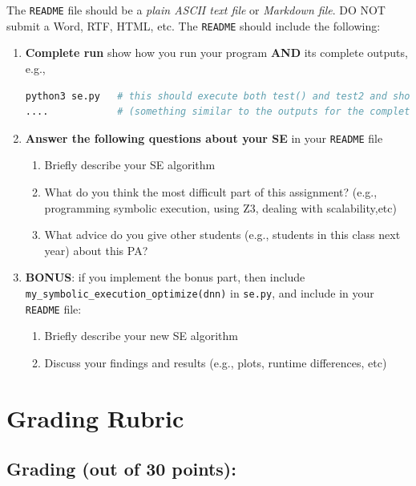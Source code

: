 \documentclass[oneside,11pt,dvipsnames]{book}
\numberwithin{equation}{section}
\theoremstyle{definition}
\theoremstyle{remark}
\newcommand{\code}[1]{\texttt{#1}}
\begin{document}
The \code{README} file should be a \textit{plain ASCII text file} or \textit{Markdown file}. DO NOT submit a Word, RTF, HTML, etc. The \code{README} should include the following:

\begin{enumerate}
\item \textbf{Complete run} show how you run your program \textbf{AND} its complete outputs, e.g.,

\begin{lstlisting}[language=bash]
python3 se.py   # this should execute both test() and test2 and show all outputs 
....            # (something similar to the outputs for the complete example above)
\end{lstlisting}

\item \textbf{Answer the following questions about your SE} in your \code{README} file
    \begin{enumerate}[label=(\alph*)]
    \item Briefly describe your SE algorithm
    \item What do you think the most difficult part of this assignment?  (e.g., programming symbolic execution, using Z3, dealing with scalability,etc)
    \item What advice do you give other students (e.g., students in this class next year) about this PA?
    \end{enumerate}


\item \textbf{BONUS}: if you implement the bonus part, then include \code{my\_symbolic\_execution\_optimize(dnn)} in \code{se.py}, and include in your \code{README} file:
    \begin{enumerate}[label=(\alph*)]
    \item Briefly describe your new SE algorithm
    \item Discuss your findings and results (e.g., plots, runtime differences, etc)
    \end{enumerate}
\end{enumerate}

\section*{Grading Rubric}

\subsection*{Grading (out of 30 points):}
\end{document}
